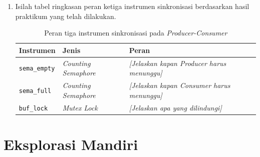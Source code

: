 \begin{enumerate}
	\item Isilah tabel ringkasan peran ketiga instrumen sinkronisasi berdasarkan hasil praktikum yang telah dilakukan.

	      \begin{table}[htbp]
		      \centering
		      \caption{Peran tiga instrumen sinkronisasi pada \textit{Producer-Consumer}}
		      \begin{tabulary}{\textwidth}{|l|l|L|}
			      \hline
			      \textbf{Instrumen} & \textbf{Jenis} & \textbf{Peran} \\ \hline
			      \texttt{sema\_empty}
			      & \textit{Counting Semaphore}
			      & \textit{[Jelaskan kapan Producer harus menunggu]} \\ \hline
			      \texttt{sema\_full}
			      & \textit{Counting Semaphore}
			      & \textit{[Jelaskan kapan Consumer harus menunggu]} \\ \hline
			      \texttt{buf\_lock}
			      & \textit{Mutex Lock}
			      & \textit{[Jelaskan apa yang dilindungi]} \\ \hline
		      \end{tabulary}
	      \end{table}

\end{enumerate}

\section{Eksplorasi Mandiri}

